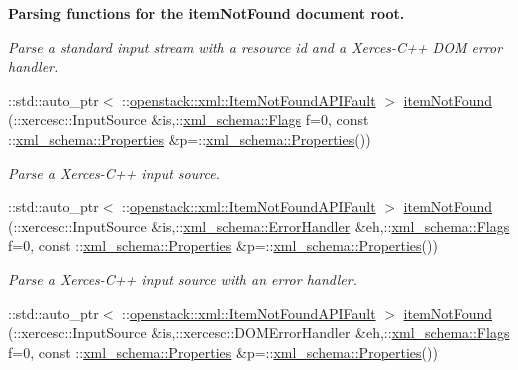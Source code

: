 \begin{Indent}{\bf Parsing functions for the itemNotFound document root.}
\begin{DoxyCompactItemize}
\begin{DoxyCompactList}\small\item\em Parse a standard input stream with a resource id and a Xerces-\/C++ DOM error handler. \item\end{DoxyCompactList}\item 
::std::auto\_\-ptr$<$ ::\hyperlink{classopenstack_1_1xml_1_1ItemNotFoundAPIFault}{openstack::xml::ItemNotFoundAPIFault} $>$ \hyperlink{namespaceopenstack_1_1xml_a699b253e7cb5fd4f7c907f01b2063796}{itemNotFound} (::xercesc::InputSource \&is,::\hyperlink{namespacexml__schema_affb4c227cbd9aa7453dd1dc5a1401943}{xml\_\-schema::Flags} f=0, const ::\hyperlink{namespacexml__schema_ad27ce19a7ee1d3b1064092648898f64c}{xml\_\-schema::Properties} \&p=::\hyperlink{namespacexml__schema_ad27ce19a7ee1d3b1064092648898f64c}{xml\_\-schema::Properties}())
\begin{DoxyCompactList}\small\item\em Parse a Xerces-\/C++ input source. \item\end{DoxyCompactList}\item 
::std::auto\_\-ptr$<$ ::\hyperlink{classopenstack_1_1xml_1_1ItemNotFoundAPIFault}{openstack::xml::ItemNotFoundAPIFault} $>$ \hyperlink{namespaceopenstack_1_1xml_aa827f9f7bc8222347fa075799430d848}{itemNotFound} (::xercesc::InputSource \&is,::\hyperlink{namespacexml__schema_ab1c9361bfd3b404eaabf0c31eded79dc}{xml\_\-schema::ErrorHandler} \&eh,::\hyperlink{namespacexml__schema_affb4c227cbd9aa7453dd1dc5a1401943}{xml\_\-schema::Flags} f=0, const ::\hyperlink{namespacexml__schema_ad27ce19a7ee1d3b1064092648898f64c}{xml\_\-schema::Properties} \&p=::\hyperlink{namespacexml__schema_ad27ce19a7ee1d3b1064092648898f64c}{xml\_\-schema::Properties}())
\begin{DoxyCompactList}\small\item\em Parse a Xerces-\/C++ input source with an error handler. \item\end{DoxyCompactList}\item 
::std::auto\_\-ptr$<$ ::\hyperlink{classopenstack_1_1xml_1_1ItemNotFoundAPIFault}{openstack::xml::ItemNotFoundAPIFault} $>$ \hyperlink{namespaceopenstack_1_1xml_a06a909ce848a137a5b23ce66ecc1fc7d}{itemNotFound} (::xercesc::InputSource \&is,::xercesc::DOMErrorHandler \&eh,::\hyperlink{namespacexml__schema_affb4c227cbd9aa7453dd1dc5a1401943}{xml\_\-schema::Flags} f=0, const ::\hyperlink{namespacexml__schema_ad27ce19a7ee1d3b1064092648898f64c}{xml\_\-schema::Properties} \&p=::\hyperlink{namespacexml__schema_ad27ce19a7ee1d3b1064092648898f64c}{xml\_\-schema::Properties}())

\end{DoxyCompactItemize}
\end{Indent}
